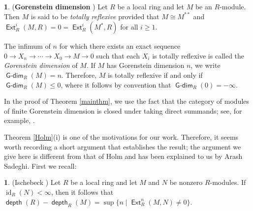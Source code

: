 \documentclass{amsart}
\theoremstyle{plain} %
\theoremstyle{definition}
\newtheorem{chunk}[thm]{\hspace*{-1.065ex}\bf}
\DeclareMathOperator{\id}{id}
\def\Ext{\operatorname{\mathsf{Ext}}}
\def\depth{\operatorname{\mathsf{depth}}}
\DeclareMathOperator{\Gdim}{\mathsf{G-dim}}
\begin{document}
\begin{chunk} \label{Gdim} (\textbf{Gorenstein dimension} \cite{Tome1, AuBr}) Let $R$ be a local ring and let $M$ be an $R$-module. Then $M$ is said to be \emph{totally reflexive} provided that $M\cong M^{\ast\ast}$ and $\Ext^i_R(M,R) = 0 = \Ext^i_R(M^{\ast},R)$ for all $i\geq 1$. 

The infimum of $n$ for which there exists an exact sequence $0\to X_n \to \cdots \to X_0 \to M \to 0$ such that each $X_i$ is totally reflexive is called the \emph{Gorenstein dimension} of $M$. If $M$ has Gorenstein dimension $n$, we write $\Gdim_R(M) = n$. Therefore, $M$ is totally reflexive if and only if $\Gdim_R(M)\leq 0$, where it follows by convention that $\Gdim_R(0)=-\infty$.

In the proof of Theorem \ref{mainthm}, we use the fact that the category of modules of finite Gorenstein dimension is closed under taking direct summands; see, for example, \cite[1.1.10(c)]{Gdimbook}.\pushQED{\qed} 
\qedhere
\popQED	
\end{chunk}


Theorem \ref{Holm}(i) is one of the motivations for our work. Therefore, it seems worth recording a short argument that establishes the result; the argument we give here is different from that of Holm \cite{Holm} and  has been explained to us by Arash Sadeghi. First we recall:


\begin{chunk} \label{Isc} (Ischebeck \cite[2.6]{Ischebeck}) Let $R$ be a local ring and let $M$ and $N$ be nonzero $R$-modules.
If $\id_R(N)<\infty$, then it follows that $\depth(R)-\depth_R(M)=\sup\{n\mid \Ext^n_R(M,N)\not=0\}$. \pushQED{\qed} 
\qedhere
\popQED	
\end{chunk}

\end{document}
